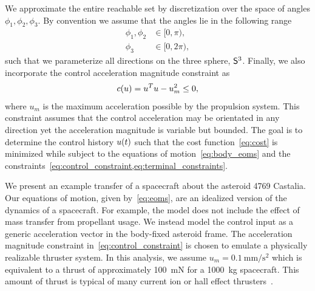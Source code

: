 We approximate the entire reachable set by discretization  over the space of angles \(\phi_1, \phi_2, \phi_3 \).
By convention we assume that the angles lie in the following range
\begin{align*}
    \phi_1, \phi_2 &\in [ 0, \pi ) ,\\
    \phi_3 &\in [ 0 , 2 \pi ) ,
\end{align*}
such that we parameterize all directions on the three sphere, \(\S^3\).
Finally, we also incorporate the control acceleration magnitude constraint as
\begin{align}\label{eq:control_constraint}
    c(\vc{u}) = \vc{u}^T \vc{u} - u_m^2 \leq 0 ,
\end{align}
where \( u_m \) is the maximum acceleration possible by the propulsion system.
This constraint assumes that the control acceleration may be orientated in any direction yet the acceleration magnitude is variable but bounded.
The goal is to determine the control history \( \vc{u}(t) \) such that the cost function~\cref{eq:cost} is minimized while subject to the equations of motion~\cref{eq:body_eoms} and the constraints~\cref{eq:control_constraint,eq:terminal_constraints}.

We present an example transfer of a spacecraft about the asteroid 4769 Castalia. 
Our equations of motion, given by~\cref{eq:eoms}, are an idealized version of the dynamics of a spacecraft.
For example, the model does not include the effect of mass transfer from propellant usage. 
We instead model the control input as a generic acceleration vector in the body-fixed asteroid frame. 
The acceleration magnitude constraint in~\cref{eq:control_constraint} is chosen to emulate a physically realizable thruster system.
In this analysis, we assume \( u_m = \SI{0.1}{\milli\meter\per\second\squared}\) which is equivalent to a thrust of approximately \SI{100}{\milli\newton} for a \SI{1000}{\kilo\gram} spacecraft.
This amount of thrust is typical of many current ion or hall effect thrusters~\cite{goebel2008,choueiri2009}.

